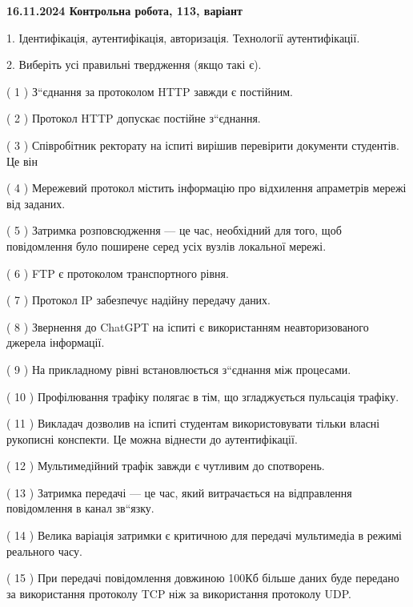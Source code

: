 \documentclass[12pt, ukrainian]{article}
\begin{document}
\vspace{4mm}
\newpage
\begin {large}

\textbf{16.11.2024 Контрольна робота, 113, варіант  }\par


{
1. Ідентифікація, аутентифікація, авторизація. Технології аутентифікації.



\vspace{5mm}
2. Виберіть усі правильні твердження (якщо такі є).\par
\vspace{2mm}

( 1 ) З“єднання за протоколом  HTTP завжди є постійним.

( 2 ) Протокол  HTTP допускає постійне з“єднання.

( 3 ) Співробітник ректорату на іспиті вирішив перевірити документи студентів. Це він

( 4 ) Мережевий протокол містить інформацію про відхилення апраметрів мережі від заданих.

( 5 ) Затримка розповсюдження — це час, необхідний для того, щоб повідомлення було поширене серед усіх вузлів локальної мережі.

( 6 ) FTP є протоколом транспортного рівня.

( 7 ) Протокол IP забезпечує надійну передачу даних.

( 8 ) Звернення до ChatGPT на іспиті є використанням неавторизованого джерела інформації.

( 9 ) На прикладному рівні встановлюється з“єднання між процесами.

( 10 ) Профілювання трафіку полягає в тім, що згладжується пульсація трафіку.

( 11 ) Викладач дозволив на іспиті студентам використовувати тільки власні рукописні конспекти. Це можна віднести до аутентифікації.

( 12 ) Мультимедійний трафік завжди є чутливим до спотворень.

( 13 ) Затримка передачі — це час, який витрачається на відправлення повідомлення в канал зв“язку.

( 14 ) Велика варіація затримки є критичною для передачі мультимедіа в режимі реального часу.

( 15 ) При передачі повідомлення довжиною 100Кб більше даних буде передано за використання протоколу TCP ніж за використання протоколу UDP.
}
\end {large}
\end{document}
